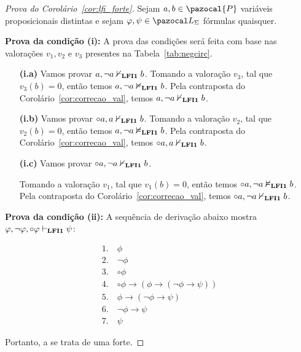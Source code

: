     \begin{proof}[Prova do Corolário~\ref{cor:lfi_forte}]
        Sejam $a, b \in \pazocal{P}$ variáveis proposicionais distintas e sejam $\phi, \psi \in \ling{}$ fórmulas quaisquer.
        
        \noindent\textbf{Prova da condição (i):} A prova das condições será feita com base nas valorações $v_1, v_2$ e $v_3$ presentes na Tabela~\ref{tab:negcirc}.

        \begin{itemize}
            \item[\textbf{(i.a)}] Vamos provar $a, \neg a \nvdash_{{\normalfont\textbf{LFI1}}{}} b$.
                                  Tomando a valoração $v_3$, tal que $v_3(b) = 0$, então temos $a, \neg a \nvDash_{{\normalfont\textbf{LFI1}}{}} b$. Pela contraposta do Corolário~\ref{cor:correcao_val}, temos  $a, \neg a \nvdash_{{\normalfont\textbf{LFI1}}{}} b$.
            \item[\textbf{(i.b)}] Vamos provar $\circ a, a \nvdash_{{\normalfont\textbf{LFI1}}{}} b$.
                                  Tomando a valoração $v_2$, tal que $v_2(b) = 0$, então temos $a, \neg a \nvDash_{{\normalfont\textbf{LFI1}}{}} b$. Pela contraposta do Corolário~\ref{cor:correcao_val}, temos $\circ a, a \nvdash_{{\normalfont\textbf{LFI1}}{}} b$.
            \item[\textbf{(i.c)}] Vamos provar $\circ a, \neg a \nvdash_{{\normalfont\textbf{LFI1}}{}} b$.

                                  Tomando a valoração $v_1$, tal que $v_1(b) = 0$, então temos $\circ a, \neg a \nvDash_{{\normalfont\textbf{LFI1}}{}} b$. Pela contraposta do Corolário~\ref{cor:correcao_val}, temos $\circ a, \neg a \nvdash_{{\normalfont\textbf{LFI1}}{}} b$.
            
        \end{itemize}


        \noindent\textbf{Prova da condição (ii):} A sequência de derivação abaixo mostra $\varphi, \neg \varphi, \circ \varphi \vdash_{{\normalfont\textbf{LFI1}}{}} \psi$:

        \begin{align*}
            1.~ & \phi \tag{Premissa}       \\
            2.~ & \neg \phi \tag{Premissa}  \\
            3.~ & \circ \phi \tag{Premissa} \\
            4.~ & \circ \phi \to (\phi \to (\neg \phi \to \psi)) \tag{bc1} \\
            5.~ & \phi \to (\neg \phi \to \psi) \tag{MP 3, 4} \\
            6.~ & \neg \phi \to \psi \tag{MP 1, 5} \\
            7.~ & \psi \tag{MP 2, 6}
        \end{align*}


        Portanto, a \lfium{} se trata de uma \lfi{} forte.
    \end{proof}

